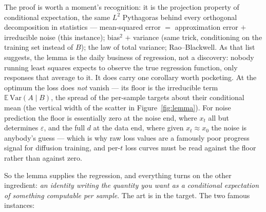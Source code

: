 \documentclass[10pt,a4paper]{article}
\newcommand{\E}{\mathbb{E}}
\newcommand{\veps}{\varepsilon}
\begin{document}
The proof is worth a moment's recognition: it is the projection
property of conditional expectation, the same $L^2$ Pythagoras behind
every orthogonal decomposition in statistics --- mean-squared error
$=$ approximation error $+$ irreducible noise (this instance);
bias$^2$ $+$ variance (same trick, conditioning on the training set
instead of $B$); the law of total variance; Rao--Blackwell. As that
list suggests, the lemma is the daily business of regression, not a
discovery: nobody running least squares expects to observe the true
regression function, only responses that average to it. It does carry
one corollary worth pocketing. At the optimum the loss does \emph{not}
vanish --- its floor is the irreducible term
$\E\,\mathrm{Var}(A \mid B)$, the spread of the per-sample targets
about their conditional mean (the vertical width of the scatter in
Figure~\ref{fig:lemma}). For noise prediction the floor is essentially
zero at the noise end, where $x_t$ all but determines $\veps$, and the
full $d$ at the data end, where given $x_t \approx x_0$ the noise is anybody's
guess --- which is why raw loss values are a famously poor progress
signal for diffusion training, and per-$t$ loss curves must be read
against the floor rather than against zero.

So the lemma supplies the regression, and everything turns on the other
ingredient: \emph{an identity writing the quantity you want as a
conditional expectation of something computable per sample}. The art is
in the target. The two famous instances:
\end{document}
